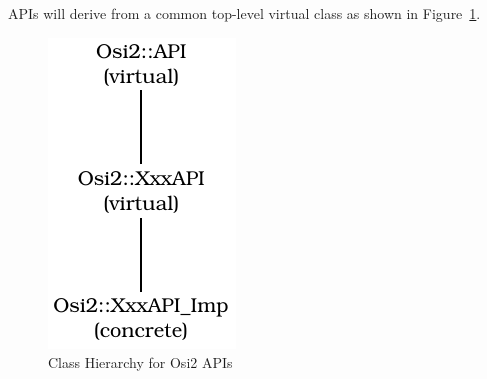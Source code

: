\documentclass{article}
\begin{document}
APIs will derive from a common top-level virtual class  as
shown in Figure~\ref{fig:OsiTwoAPIHierarchy}.
\begin{figure}[b]
\begin{center}
\includegraphics{apihierarchy}
\end{center}
\caption{Class Hierarchy for Osi2 APIs}
\label{fig:OsiTwoAPIHierarchy}
\end{figure}



\end{document}
